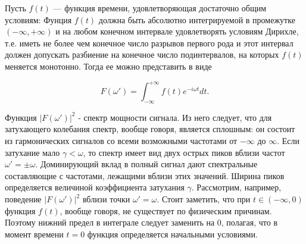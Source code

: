 \documentclass[11pt]{article}
\begin{document}
Пусть \(f(t)\) --- функция времени, удовлетворяющая достаточно общим
условиям: Фунция \(f(t)\) должна быть абсолютно интегрируемой в
промежутке \((-\infty, +\infty)\) и на любом конечном интервале
удовлетворять условиям Дирихле, т.е. иметь не более чем конечное число
разрывов первого рода и этот интервал должен допускать разбиение на
конечное число подинтервалов, на которых \(f(t)\) меняется монотонно.
Тогда ее можно представить в виде

\begin{equation}
F(\omega') = \int_{-\infty}^{+\infty} f(t) e^{- i \omega t} dt.
\end{equation}

Функция \(|F(\omega')|^2\) - спектр мощности сигнала. Из него следует,
что для затухающего колебания спектр, вообще говоря, является сплошным:
он состоит из гармонических сигналов со всеми возможными частотами от
\(-\infty\) до \(\infty\). Если затухание мало \(\gamma < \omega\), то
спектр имеет вид двух острых пиков вблизи частот
\(\omega' = \pm \omega\). Доминирующий вклад в полный сигнал дают
спектральные составляющие с частотами, лежащими вблизи этих значений.
Ширина пиков определяется величиной коэффициента затухания \(\gamma\).
Рассмотрим, например, поведение \(|F(\omega')|^2\) вблизи точки
\(\omega' = \omega\). Стоит заметить, что при \(t \in (-\infty, 0)\)
функция \(f(t)\), вообще говоря, не существует по физическим причинам.
Поэтому нижний предел в интеграле следует заменить на \(0\), полагая,
что в момент времени \(t = 0\) функция определяется начальными
условиями.
\end{document}
